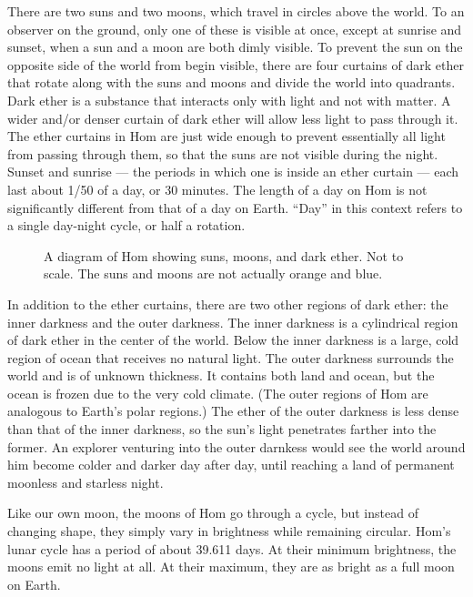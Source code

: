 \documentclass{article}
\begin{document}
There are two suns and two moons, which travel in circles above the world. To an observer on the ground, only one of these is visible at once, except at sunrise and sunset, when a sun and a moon are both dimly visible. To prevent the sun on the opposite side of the world from begin visible, there are four curtains of dark ether that rotate along with the suns and moons and divide the world into quadrants. Dark ether is a substance that interacts only with light and not with matter. A wider and/or denser curtain of dark ether will allow less light to pass through it. The ether curtains in Hom are just wide enough to prevent essentially all light from passing through them, so that the suns are not visible during the night. Sunset and sunrise --- the periods in which one is inside an ether curtain --- each last about 1/50 of a day, or 30 minutes. The length of a day on Hom is not significantly different from that of a day on Earth. ``Day'' in this context refers to a single day-night cycle, or half a rotation.

\begin{figure}[h]
  \centering
  
  \caption{A diagram of Hom showing suns, moons, and dark ether. Not to scale. The suns and moons are not actually orange and blue.}
\end{figure}

In addition to the ether curtains, there are two other regions of dark ether: the inner darkness and the outer darkness. The inner darkness is a cylindrical region of dark ether in the center of the world. Below the inner darkness is a large, cold region of ocean that receives no natural light. The outer darkness surrounds the world and is of unknown thickness. It contains both land and ocean, but the ocean is frozen due to the very cold climate. (The outer regions of Hom are analogous to Earth's polar regions.) The ether of the outer darkness is less dense than that of the inner darkness, so the sun's light penetrates farther into the former. An explorer venturing into the outer darnkess would see the world around him become colder and darker day after day, until reaching a land of permanent moonless and starless night.

Like our own moon, the moons of Hom go through a cycle, but instead of changing shape, they simply vary in brightness while remaining circular. Hom's lunar cycle has a period of about 39.611 days. At their minimum brightness, the moons emit no light at all. At their maximum, they are as bright as a full moon on Earth.
\end{document}
